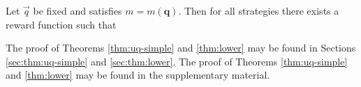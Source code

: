 \begin{theorem}\label{thm:lower}
Let $\vec{q}$ be fixed and satisfies $m = m(\boldsymbol{q})$. Then for all strategies there exists a reward function such that
\end{theorem}

\ifsup
The proof of Theorems \ref{thm:uq-simple} and \ref{thm:lower} may be found in Sections \ref{sec:thm:uq-simple} and \ref{sec:thm:lower}.
\else
The proof of Theorems \ref{thm:uq-simple} and \ref{thm:lower} may be found in the supplementary material.
\fi



